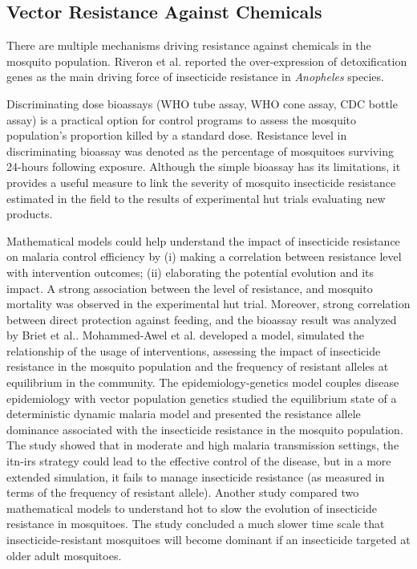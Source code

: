 \documentclass[a4paper, 12pt, twoside]{article}
\begin{document}
\subsection{Vector Resistance Against Chemicals}
There are multiple mechanisms driving resistance against chemicals in the mosquito population.
Riveron\cite{Riveron2014b} et al. reported the over-expression of detoxification genes as the main driving force of insecticide resistance in \textit{Anopheles} species.

Discriminating dose bioassays (WHO tube assay, WHO cone assay, CDC bottle assay) is a practical option for control programs to assess the mosquito population's proportion killed by a standard dose.
Resistance level in discriminating bioassay was denoted as the percentage of mosquitoes surviving 24-hours following exposure.
Although the simple bioassay has its limitations, it provides a useful measure to link the severity of mosquito insecticide resistance estimated in the field to the results of experimental hut trials evaluating new products.

Mathematical models could help understand the impact of insecticide resistance on malaria control efficiency by (i) making a correlation between resistance level with intervention outcomes; (ii) elaborating the potential evolution and its impact.
A strong association between the level of resistance, and mosquito mortality was observed in the experimental hut trial\cite{Sherrard-Smith2018b}.
Moreover, strong correlation between direct protection against feeding, and the bioassay result was analyzed by Briet et al.\cite{Briet2013}.
Mohammed-Awel et al.\cite{Mohammed-Awel2019} developed a model, simulated the relationship of the usage of interventions, assessing the impact of insecticide resistance in the mosquito population and the frequency of resistant alleles at equilibrium in the community. 
The epidemiology-genetics model couples disease epidemiology with vector population genetics studied the equilibrium state of a deterministic dynamic malaria model and presented the resistance allele dominance associated with the insecticide resistance in the mosquito population.
The study showed that in moderate and high malaria transmission settings, the \gls{itn}-\gls{irs} strategy could lead to the effective control of the disease, but in a more extended simulation, it fails to manage insecticide resistance (as measured in terms of the frequency of resistant allele).
Another study\cite{Gourley2011} compared two mathematical models to understand hot to slow the evolution of insecticide resistance in mosquitoes.
The study concluded a much slower time scale that insecticide-resistant mosquitoes will become dominant if an insecticide targeted at older adult mosquitoes.
\end{document}
